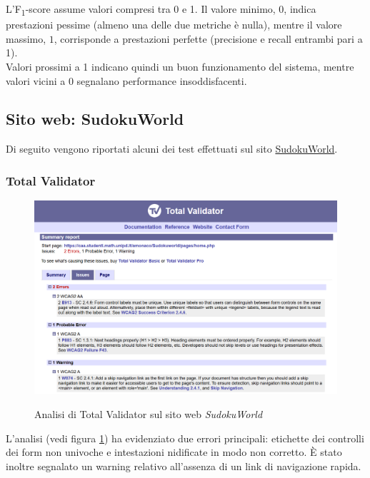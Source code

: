 \noindent L’F\textsubscript{1}-score assume valori compresi tra 0 e 1. Il valore minimo, \(0\), indica prestazioni pessime (almeno una delle due metriche è nulla), mentre il valore massimo, \(1\), corrisponde a prestazioni perfette (precisione e recall entrambi pari a 1).\\
Valori prossimi a 1 indicano quindi un buon funzionamento del sistema, mentre valori vicini a 0 segnalano performance insoddisfacenti.


\subsection{Sito web: SudokuWorld}
\noindent Di seguito vengono riportati alcuni dei test effettuati sul sito \href{https://caa.studenti.math.unipd.it/amonaco/Sudokuworld/pages/home.php}{SudokuWorld}.

\subsubsection{Total Validator}
\begin{figure}[H]
    \centering
    \includegraphics[width=0.7\linewidth, alt={Screenshot dell'analisi di Total Validator sul sito web SudokuWorld}]{img/TV_sudoku.png}
    \caption{Analisi di Total Validator sul sito web \textit{SudokuWorld}}\label{fig:TV_sudoku}
\end{figure}

\noindent L'analisi (vedi figura \ref{fig:TV_sudoku}) ha evidenziato due errori principali: etichette dei controlli dei form non univoche e intestazioni nidificate in modo non corretto. 
È stato inoltre segnalato un warning relativo all’assenza di un link di navigazione rapida. 
 
